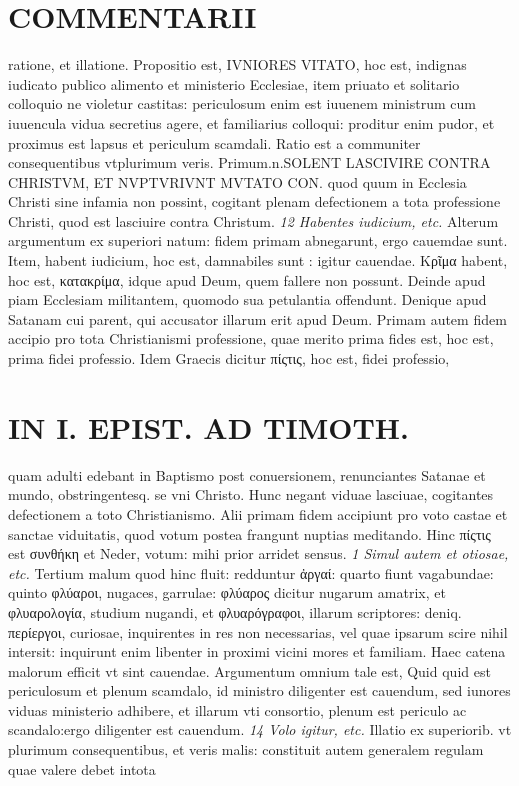 \documentclass{article}
\begin{document}
\begin{pages}
\section*{COMMENTARII }
\marginpar{[ p.128 ]}\pstart ratione, et illatione. Propositio est, IVNIORES VITATO, hoc est, indignas iudicato publico alimento et ministerio Ecclesiae, item priuato et solitario colloquio ne violetur castitas: periculosum enim est iuuenem ministrum cum iuuencula vidua secretius agere, et familiarius colloqui: proditur enim pudor, et proximus est lapsus et periculum scamdali. Ratio est a communiter consequentibus vtplurimum veris. Primum.n.SOLENT LASCIVIRE CONTRA CHRISTVM, ET NVPTVRIVNT MVTATO CON. quod quum in Ecclesia Christi sine infamia non possint, cogitant plenam defectionem a tota professione Christi, quod est lasciuire contra Christum.  \pend
\textit{12 Habentes iudicium, etc. }\pstart Alterum argumentum ex superiori natum: fidem primam abnegarunt, ergo cauemdae sunt. Item, habent iudicium, hoc est, damnabiles sunt : igitur cauendae. Κρῖμα habent, hoc est, κατακρίμα, idque apud Deum, quem fallere non possunt. Deinde apud piam Ecclesiam militantem, quomodo sua petulantia offendunt. Denique apud Satanam cui parent, qui accusator illarum erit apud Deum.  \pend\pstart Primam autem fidem accipio pro tota Christianismi professione, quae merito prima fides est, hoc est, prima fidei professio. Idem Graecis dicitur πίςτις, hoc est, fidei professio,  \pend
\section*{IN I. EPIST. AD TIMOTH. }
\marginpar{[ p.129 ]}\pstart quam adulti edebant in Baptismo post conuersionem, renunciantes Satanae et mundo, obstringentesq. se vni Christo. Hunc negant viduae lasciuae, cogitantes defectionem a toto Christianismo. Alii primam fidem accipiunt pro voto castae et sanctae viduitatis, quod votum postea frangunt nuptias meditando. Hinc πίςτις est συνθήκη et Neder, votum: mihi prior arridet sensus.  \pend
\textit{1 Simul autem et otiosae, etc. }\pstart Tertium malum quod hinc fluit: redduntur ἀργαί: quarto fiunt vagabundae: quinto φλύαροι, nugaces, garrulae: φλύαρος dicitur nugarum amatrix, et φλυαρολογία, studium nugandi, et φλυαρόγραφοι, illarum scriptores: deniq. περίεργοι, curiosae, inquirentes in res non necessarias, vel quae ipsarum scire nihil intersit: inquirunt enim libenter in proximi vicini mores et familiam. Haec catena malorum efficit vt sint cauendae. Argumentum omnium tale est, Quid quid est periculosum et plenum scamdalo, id ministro diligenter est cauendum, sed iunores viduas ministerio adhibere, et illarum vti consortio, plenum est periculo ac scandalo:ergo diligenter est cauendum.  \pend
\textit{14 Volo igitur, etc. }\pstart Illatio ex superiorib. vt plurimum consequentibus, et veris malis: constituit autem generalem regulam quae valere debet intota  \pend

\end{pages}
\end{document}
